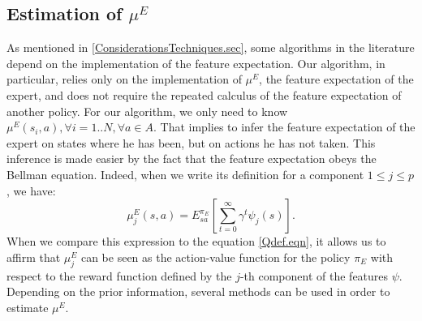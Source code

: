 \documentclass{article}
\begin{document}
\subsection{Estimation of $\mu^E$}
\label{calculmu.sec}
As mentioned in \ref{ConsiderationsTechniques.sec}, some algorithms in the literature depend on the implementation of the feature expectation. Our algorithm, in particular, relies only on the implementation of $\mu^E$, the feature expectation of the expert, and does not require the repeated calculus of the feature expectation of another policy.
For our algorithm, we only need to know $\mu^E(s_i,a), \forall i= 1..N,\forall a \in A$.
That implies to infer the feature expectation of the expert on states where he has been, but on actions he has not taken.
This inference is made easier by the fact that the feature expectation obeys the Bellman equation. Indeed, when we write its definition for a component $1\leq j\leq p$, we have:
\begin{equation}
\mu^E_j(s,a) = E^{\pi_E}_{sa}[\sum\limits_{t=0}^\infty \gamma^t \psi_j(s)].
\end{equation}
When we compare this expression to the equation \eqref{Qdef.eqn}, it allows us to affirm that $\mu_j^E$ can be seen as the action-value function for the policy $\pi_E$ with respect to the reward function defined by the $j$-th component of the features $\psi$. Depending on the prior information, several methods can be used in order to estimate $\mu^E$.\\
\end{document}
